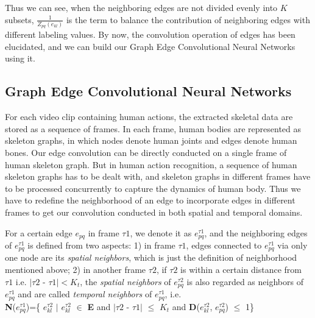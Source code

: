 \documentclass[a4paper,11pt]{article}
\begin{document}
Thus we can see, when the neighboring edges are not divided evenly into $K$ subsets, {\large $\frac{1}{Z_{pq}(e_{kl})}$} is the term  to balance the contribution of neighboring edges with different labeling values. By now, the convolution operation of edges has been elucidated, and we can build our Graph Edge Convolutional Neural Networks using it.




\subsection{Graph Edge Convolutional Neural Networks}
For each video clip containing human actions, the extracted skeletal data are stored as a sequence of frames. In each frame, human bodies are represented as skeleton graphs, in which nodes denote human joints and edges denote human bones.
Our edge convolution can be directly conducted on a single frame of human skeleton graph. But in human action recognition, a sequence of human skeleton graphs has to be dealt with, and skeleton graphs in different frames have to be processed concurrently to capture the dynamics of human body. Thus we have to redefine the neighborhood of an edge to incorporate edges in different frames to get our convolution conducted in both spatial and temporal domains. 

For a certain edge $e_{pq}$ in frame $\tau1$, we denote it as $e_{pq}^{\tau 1}$, and the neighboring edges of $e_{pq}^{\tau 1}$ is defined from two aspects: 1) in frame $\tau 1$, edges connected to $e_{pq}^{\tau 1}$ via only one node are its {\it spatial neighbors}, which is just the definition of neighborhood mentioned above; 2) in another frame $\tau2$, if $\tau2$ is within a certain distance from $\tau1$ i.e. $| \tau 2 $ - $\tau 1 |<K_t$, the {\it spatial neighbors} of $e_{pq}^{\tau 2}$ is also regarded as neighbors of $e_{pq}^{\tau 1}$ and are called {\it temporal neighbors} of $e_{pq}^{\tau 1}$, i.e. \\
 {\bf N}($e_{pq}^{\tau 1}$)=\{ $e_{kl}^{\tau 2}$ $|$ $e_{kl}^{\tau 2}$ $\in$ {\bf E} and $| \tau 2 $ - $\tau 1 |$ $\leqslant$ $K_t$ and {\bf D}($e_{kl}^{\tau2}$, $e_{pq}^{\tau2}$) $\leqslant$ 1\}\\


\iffalse
\begin{align}
& {\bf N}(e_{pq}^{\tau 1})=\{e_{kl}^{\tau 2}|e_{kl}^{\tau 2} \in {\bf E} and | \tau 2  - \tau 1 | \le K_t \quad and \quad {\bf D}(e_{kl}^{\tau2}, e_{pq}^{\tau2}) \leqslant 1             \} &
\end{align}
\fi
\end{document}
